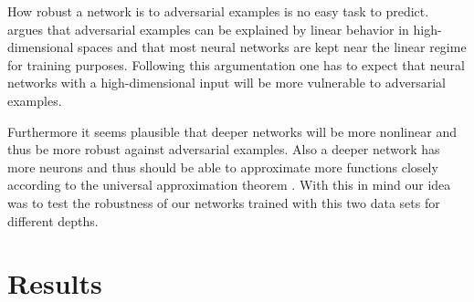 \documentclass[%
 reprint,
 amsmath,amssymb,
 aps,
]{revtex4-1}
\begin{document}
How robust a network is to adversarial examples is no easy task to predict. \citet{paperGrad} argues that adversarial examples can be explained by linear behavior in high-dimensional spaces and that most neural networks are kept near the linear regime for training purposes. Following this argumentation one has to expect that neural networks with a high-dimensional input will be more vulnerable to adversarial examples.

Furthermore it seems plausible that deeper networks will be more nonlinear and thus be more robust against adversarial examples. Also a deeper network has more neurons and thus should be able to approximate more functions closely according to the universal approximation theorem \cite{HORNIK1991251}. With this in mind our idea was to test the robustness of our networks trained with this two data sets for different depths.



\section{Results}
\end{document}
